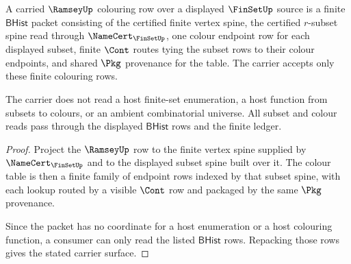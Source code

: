 \begin{theorem}
\label{thm:ramsey-colouring-carrier-obligation}
A carried $\RamseyUp$ colouring row over a displayed $\FinSetUp$ source is a
finite $\mathsf{BHist}$ packet consisting of the certified finite vertex
spine, the certified $r$-subset spine read through $\NameCert_{\FinSetUp}$,
one colour endpoint row for each displayed subset, finite $\Cont$ routes tying
the subset rows to their colour endpoints, and shared $\Pkg$ provenance for
the table. The carrier accepts only these finite colouring rows.

The carrier does not read a host finite-set enumeration, a host function from
subsets to colours, or an ambient combinatorial universe. All subset and colour
reads pass through the displayed $\mathsf{BHist}$ rows and the finite ledger.
\end{theorem}
\begin{proof}
Project the $\RamseyUp$ row to the finite vertex spine supplied by
$\NameCert_{\FinSetUp}$ and to the displayed subset spine built over it. The
colour table is then a finite family of endpoint rows indexed by that subset
spine, with each lookup routed by a visible $\Cont$ row and packaged by the
same $\Pkg$ provenance.

Since the packet has no coordinate for a host enumeration or a host colouring
function, a consumer can only read the listed $\mathsf{BHist}$ rows. Repacking
those rows gives the stated carrier surface.
\end{proof}

